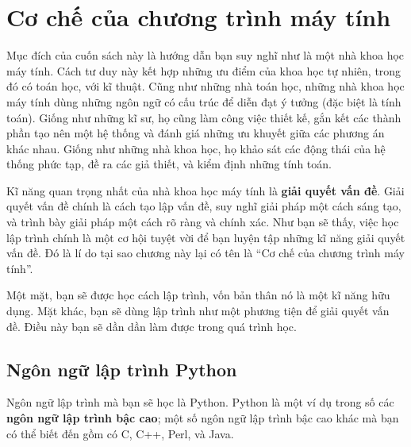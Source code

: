\documentclass[11pt]{book}
\begin{document}




\mainmatter


\chapter{Cơ chế của chương trình máy tính}

Mục đích của cuốn sách này là hướng dẫn bạn suy nghĩ như là một nhà 
khoa học máy tính. Cách tư duy này kết hợp những ưu điểm của khoa học
tự nhiên, trong đó có toán học, với kĩ thuật. Cũng như những nhà toán học,
những nhà khoa học máy tính dùng những ngôn ngữ có cấu trúc để diễn
đạt ý tưởng (đặc biệt là tính toán). Giống như những kĩ sư, họ cũng làm
công việc thiết kế, gắn kết các thành phần tạo nên một hệ thống và đánh giá
những ưu khuyết giữa các phương án khác nhau. Giống như những nhà
khoa học, họ khảo sát các động thái của hệ thống phức tạp, đề ra các
giả thiết, và kiểm định những tính toán.



Kĩ năng quan trọng nhất của nhà khoa học máy tính là {\bf
giải quyết vấn đề}.  Giải quyết vấn đề chính là cách tạo lập vấn đề,
suy nghĩ giải pháp một cách sáng tạo, và trình bày giải pháp một cách
rõ ràng và chính xác. Như bạn sẽ thấy, việc học lập trình chính là một
cơ hội tuyệt vời để bạn luyện tập những kĩ năng giải quyết vấn đề. Đó là
lí do tại sao chương này lại có tên là ``Cơ chế của chương trình máy tính''.

Một mặt, bạn sẽ được học cách lập trình, vốn bản thân nó là một kĩ năng
hữu dụng. Mặt khác, bạn sẽ dùng lập trình như một phương tiện để giải
quyết vấn đề. Điều này bạn sẽ dần dần làm được trong quá trình học.

\section{Ngôn ngữ lập trình Python}

Ngôn ngữ lập trình mà bạn sẽ học là Python. Python là một ví dụ trong số
các {\bf ngôn ngữ lập trình bậc cao}; một số ngôn ngữ lập trình bậc cao
khác mà bạn có thể biết đến gồm có C, C++, Perl, và Java.
\end{document}
